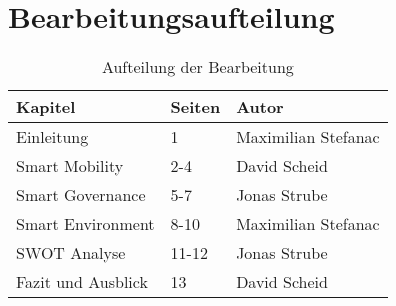 \section{Bearbeitungsaufteilung}

\begin{table}[h] %
	\caption*{Aufteilung der Bearbeitung}
	\begin{center}
		\begin{tabular}{l|l|l}
			Kapitel & Seiten & Autor \\
			\hline
			\hline
			Einleitung & 1 & Maximilian Stefanac  \\
			Smart Mobility & 2-4 & David Scheid  \\
			Smart Governance & 5-7 & Jonas Strube  \\
			Smart Environment & 8-10 & Maximilian Stefanac  \\
			SWOT Analyse & 11-12 & Jonas Strube  \\
			Fazit und Ausblick & 13 & David Scheid  \\
			\hline
		\end{tabular}
	\end{center}
\end{table}